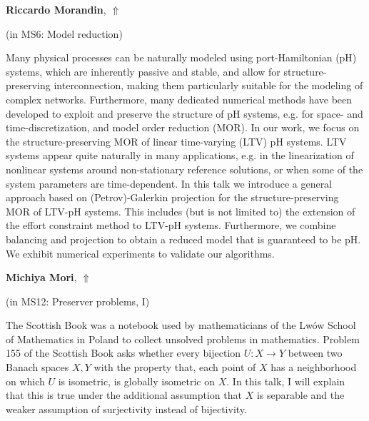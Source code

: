 \documentclass[ILAS2025-program.tex]{subfiles}
\begin{document}
\hypertarget{down0165}{}\begin{ilasabstract}
    
\textbf{Riccardo Morandin},  \hfill \hyperlink{up0165}{$\Uparrow$}
    
    
(in {\color{mstitle}MS6: Model reduction})
        
\mtskip
    Many physical processes can be naturally modeled using port-Hamiltonian (pH) systems, which are inherently passive and stable, and allow for structure-preserving interconnection, making them particularly suitable for the modeling of complex networks. Furthermore, many dedicated numerical methods have been developed to exploit and preserve the structure of pH systems, e.g. for space- and time-discretization, and model order reduction (MOR).
In our work, we focus on the structure-preserving MOR of linear time-varying (LTV) pH systems. LTV systems appear quite naturally in many applications, e.g. in the linearization of nonlinear systems around non-stationary reference solutions, or when some of the system parameters are time-dependent.
In this talk we introduce a general approach based on (Petrov)-Galerkin projection for the structure-preserving MOR of LTV-pH systems. This includes (but is not limited to) the extension of the effort constraint method to LTV-pH systems. Furthermore, we combine balancing and projection to obtain a reduced model that is guaranteed to be pH. We exhibit numerical experiments to validate our algorithms.

\end{ilasabstract}
    

\hypertarget{down0127}{}\begin{ilasabstract}
    
\textbf{Michiya Mori},  \hfill \hyperlink{up0127}{$\Uparrow$}
    
    
(in {\color{mstitle}MS12: Preserver problems, I})
        
\mtskip
    The Scottish Book was a notebook used by mathematicians of the Lw\'ow School of Mathematics in Poland to collect unsolved problems in mathematics.
Problem 155 of the Scottish Book asks whether every bijection $U\colon X\to Y$ between two Banach spaces $X, Y$ with the property that, each point of $X$ has a neighborhood on which $U$ is isometric, is globally isometric on $X$. 
In this talk, I will explain that this is true under the additional assumption that $X$ is separable and the weaker assumption of surjectivity instead of bijectivity.

\end{ilasabstract}
    
\end{document}
